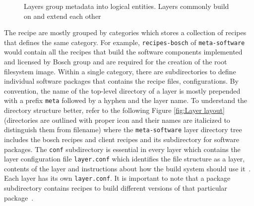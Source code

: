 \vspace{0.5cm}
\begin{figure}[H]
\centering
{}
\caption[Meta layer architecture]{Layers group metadata into logical entities. Layers commonly build on and extend each other~\parencite{Reference1} }
\label{fig:Meta layer architecture}
\end{figure}
\vspace{0.5cm}


The recipe are mostly grouped by categories which stores a collection of recipes that defines the same category. For example, \texttt{recipes-bosch} of \texttt{meta-software} would contain all the recipes that build the software components implemented and licensed by Bosch group and are required for the creation of the root filesystem image. Within a single category, there are subdirectories to define individual software packages that contains the recipe files, configurations. By convention, the name of the top-level directory of a layer is mostly prepended with a prefix \texttt{meta} followed by a hyphen and the layer name. To understand the directory structure better, refer to the following Figure \ref{fig:Layer layout} (directories are outlined with proper icon and their names are italicized to distinguish them from filename) where the \texttt{meta-software} layer directory tree includes the bosch recipes and client recipes and its subdirectory for software packages. The \texttt{conf} subdirectory is essential in every layer which contains the layer configuration file \texttt{layer.conf} which identifies the file structure as a layer, contents of the layer and instructions about how the build system should use it~\parencite{Reference2}. Each layer has its own \texttt{layer.conf}. It is important to note that a package subdirectory contains recipes to build different versions of that particular package~\parencite{Reference1}.

